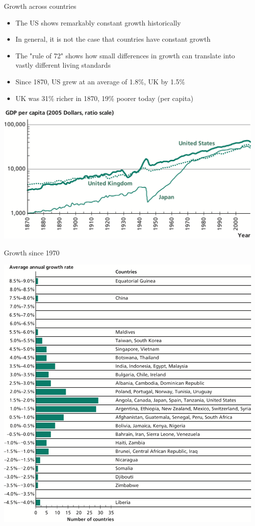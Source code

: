 \documentclass[10pt]{beamer}
\begin{document}
\begin{frame}[label={sec:org371f87f}]{}
\alert{Growth across countries}
\begin{itemize}
\item The US shows remarkably constant growth historically
\item In general, it is not the case that countries have constant growth
\item The "rule of 72" shows how small differences in growth can translate into vastly different living standards
\item Since 1870, US grew at an average of 1.8\%, UK by 1.5\%
\item UK was 31\% richer in 1870, 19\% poorer today (per capita)
\end{itemize}
\end{frame}

\begin{frame}[label={sec:org5bfe483}]{}
\begin{center}
\includegraphics[width=.75\textwidth]{./img/1.5.png}
\end{center}
\end{frame}

\begin{frame}[label={sec:org8afce4d}]{}
\alert{Growth since 1970}
\begin{center}
\includegraphics[width=.65\textwidth]{./img/1.6.png}
\end{center}
\end{frame}
\end{document}
